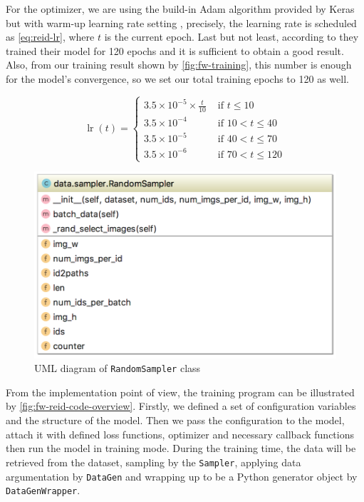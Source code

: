 For the optimizer, we are using the build-in Adam algorithm provided by Keras
but with warm-up learning rate setting \cite{learning-rate-warmup-2018},
precisely, the learning rate is scheduled as \autoref{eq:reid-lr}, where $t$ is
the current epoch. Last but not least, according to
\cite{tricks-and-baseline-for-reid-2019} they trained their model for 120
epochs and it is sufficient to obtain a good result. Also, from our training
result shown by \autoref{fig:fw-training}, this number is enough for the
model's convergence, so we set our total training epochs to 120 as well.

\begin{equation}
\label{eq:reid-lr}
\operatorname{lr}(t)=\left\{
\begin{array}{ll}
{3.5 \times 10^{-5} \times \frac{t}{10}} & {\text { if } t \leq 10} \\
{3.5 \times 10^{-4}} & {\text { if } 10<t \leq 40} \\
{3.5 \times 10^{-5}} & {\text { if } 40<t \leq 70} \\
{3.5 \times 10^{-6}} & {\text { if } 70<t \leq 120}
\end{array}\right.
\end{equation}

\begin{figure}
    \begin{center}
        \includegraphics[scale=0.6]{figures/framework_reid_sampler_uml.png}
    \end{center}
    \caption{UML diagram of \texttt{RandomSampler} class}
    \label{fig:fw-sampler-uml}
\end{figure}

From the implementation point of view, the training program can be illustrated by
\autoref{fig:fw-reid-code-overview}. Firstly, we defined a set of configuration
variables and the structure of the model. Then we pass the configuration to the
model, attach it with defined loss functions, optimizer and necessary
callback functions then run the model in training mode. During the training
time, the data will be retrieved from the dataset, sampling by the
\texttt{Sampler}, applying data argumentation by \texttt{DataGen} and wrapping
up to be a Python generator object by \texttt{DataGenWrapper}.

